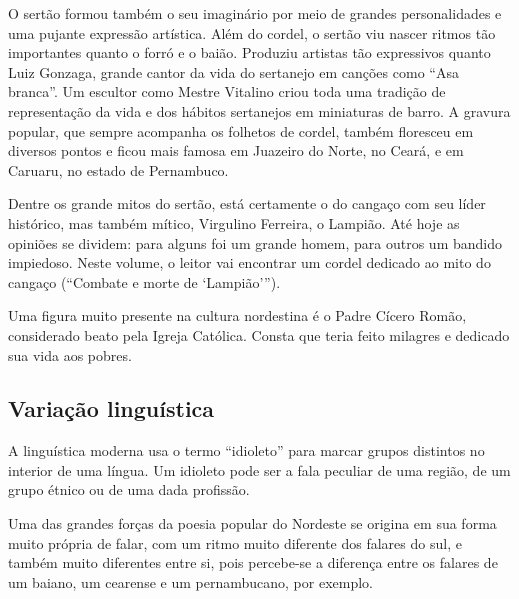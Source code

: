O sertão formou também o seu imaginário por meio de grandes
personalidades e uma pujante expressão artística. Além do cordel, o
sertão viu nascer ritmos tão importantes quanto o forró e o baião.
Produziu artistas tão expressivos quanto Luiz Gonzaga, grande cantor da
vida do sertanejo em canções como ``Asa
branca''. Um escultor como Mestre Vitalino criou toda
uma tradição de representação da vida e dos hábitos sertanejos em
miniaturas de barro. A gravura popular, que sempre acompanha os
folhetos de cordel, também floresceu em diversos pontos e ficou mais
famosa em Juazeiro do Norte, no Ceará, e em Caruaru, no estado de
Pernambuco. 

Dentre os grande mitos do sertão, está certamente o do cangaço com seu
líder histórico, mas também mítico, Virgulino Ferreira, o Lampião. Até
hoje as opiniões se dividem: para alguns foi um grande homem, para
outros um bandido impiedoso. Neste volume, o leitor vai encontrar 
um cordel dedicado ao mito do cangaço (``Combate e morte de `Lampião'''). 

Uma figura muito presente na cultura nordestina é o Padre Cícero Romão,
considerado beato pela Igreja Católica. Consta que teria feito milagres
e dedicado sua vida aos pobres. 

\subsection{Variação linguística}

A linguística moderna usa o termo
``idioleto'' para marcar grupos
distintos no interior de uma língua. Um idioleto pode ser a fala
peculiar de uma região, de um grupo étnico ou de uma dada profissão. 

Uma das grandes forças da poesia popular do Nordeste se origina em sua
forma muito própria de falar, com um ritmo muito diferente dos falares
do sul, e também muito diferentes entre si, pois percebe-se a diferença
entre os falares de um baiano, um cearense e um pernambucano, por
exemplo.

